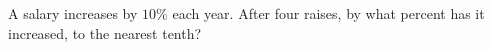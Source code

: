 A salary increases by $10\%$ each year. After four raises, by what percent has it increased, to the nearest tenth?
